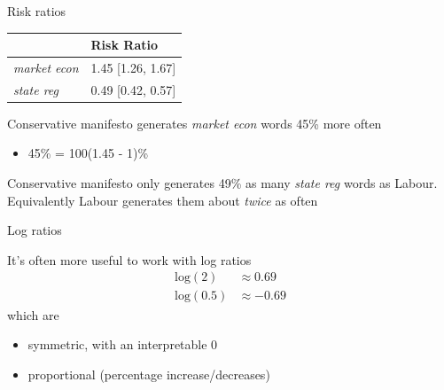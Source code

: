 \documentclass{hertieteaching}
\begin{document}
\begin{frame}{Risk ratios}
\protect\hypertarget{risk-ratios}{}

\begin{longtable}[]{@{}ll@{}}
\toprule
& Risk Ratio\tabularnewline
\midrule
\endhead
\emph{market econ} & 1.45 {[}1.26, 1.67{]}\tabularnewline
\emph{state reg} & 0.49 {[}0.42, 0.57{]}\tabularnewline
\bottomrule
\end{longtable}

Conservative manifesto generates \emph{market econ} words 45\% more
often

\begin{itemize}
\item
  45\% = 100(1.45 - 1)\%
\end{itemize}

Conservative manifesto only generates 49\% as many \emph{state reg}
words as Labour. Equivalently Labour generates them about \emph{twice}
as often

\end{frame}

\begin{frame}{Log ratios}
\protect\hypertarget{log-ratios}{}

It's often more useful to work with log ratios \[
\begin{aligned}
\text{log}(2)   & \approx 0.69\\
\text{log}(0.5) & \approx -0.69
\end{aligned}
\] which are

\begin{itemize}
\item
  symmetric, with an interpretable 0\item
  proportional (percentage increase/decreases)
\end{itemize}

\end{frame}
\end{document}
